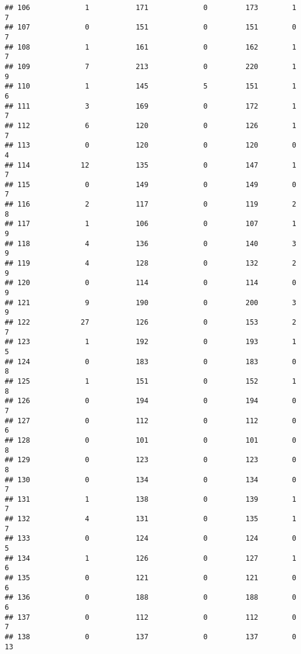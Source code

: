 \documentclass[]{article}
\begin{document}
\begin{verbatim}
## 106             1           171             0         173        1        7
## 107             0           151             0         151        0        7
## 108             1           161             0         162        1        7
## 109             7           213             0         220        1        9
## 110             1           145             5         151        1        6
## 111             3           169             0         172        1        7
## 112             6           120             0         126        1        7
## 113             0           120             0         120        0        4
## 114            12           135             0         147        1        7
## 115             0           149             0         149        0        7
## 116             2           117             0         119        2        8
## 117             1           106             0         107        1        9
## 118             4           136             0         140        3        9
## 119             4           128             0         132        2        9
## 120             0           114             0         114        0        9
## 121             9           190             0         200        3        9
## 122            27           126             0         153        2        7
## 123             1           192             0         193        1        5
## 124             0           183             0         183        0        8
## 125             1           151             0         152        1        8
## 126             0           194             0         194        0        7
## 127             0           112             0         112        0        6
## 128             0           101             0         101        0        8
## 129             0           123             0         123        0        8
## 130             0           134             0         134        0        7
## 131             1           138             0         139        1        7
## 132             4           131             0         135        1        7
## 133             0           124             0         124        0        5
## 134             1           126             0         127        1        6
## 135             0           121             0         121        0        6
## 136             0           188             0         188        0        6
## 137             0           112             0         112        0        7
## 138             0           137             0         137        0       13

\end{verbatim}
\end{document}
